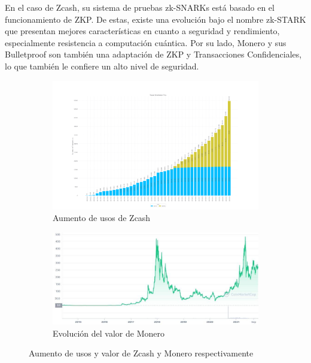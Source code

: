 En el caso de Zcash, su sistema de pruebas zk-SNARKs está basado en el funcionamiento de ZKP. De estas, existe una evolución bajo el nombre zk-STARK que presentan mejores características en cuanto a seguridad y rendimiento, especialmente resistencia a computación cuántica. Por su lado, Monero y sus Bulletproof son también una adaptación de ZKP y Transacciones Confidenciales, lo que también le confiere un alto nivel de seguridad.

\begin{figure}[ht]
    \centering
    \begin{subfigure}[c]{0.45\textwidth}
        \includegraphics[width=\textwidth]{images/zcash.png}
        \caption{Aumento de usos de Zcash \cite{zCash}}
    \end{subfigure}
    \begin{subfigure}[c]{0.45\textwidth}
        \includegraphics[width=\textwidth]{images/monero.jpg}
        \caption{Evolución del valor de Monero \cite{Monero}}
    \end{subfigure}
    
    \caption{Aumento de usos y valor de Zcash y Monero respectivamente}
    \label{im:motivacion}
\end{figure}

